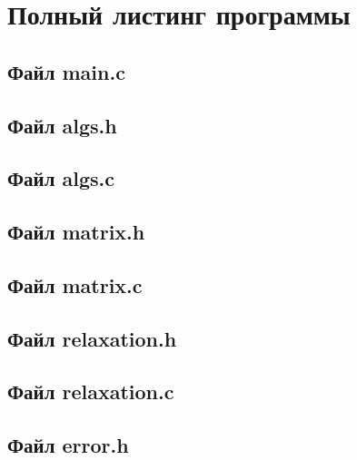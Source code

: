 \documentclass[a4paper,12pt,titlepage,finall]{article}
\begin{document}
\newpage
\section{Полный листинг программы} \label{source}

\subsection{Файл main.c}

\subsection{Файл algs.h}

\subsection{Файл algs.c}

\subsection{Файл matrix.h}

\subsection{Файл matrix.c}

\subsection{Файл relaxation.h}

\subsection{Файл relaxation.c}

\subsection{Файл error.h}

\end{document}
